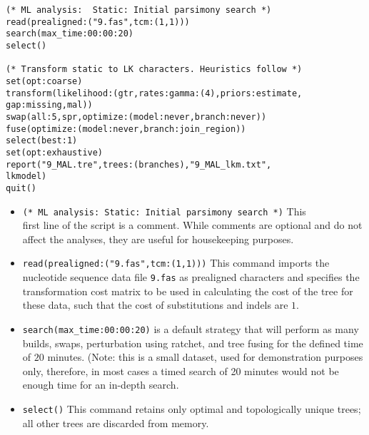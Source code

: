 \begin{verbatim}
(* ML analysis:  Static: Initial parsimony search *)
read(prealigned:("9.fas",tcm:(1,1)))
search(max_time:00:00:20)
select()

(* Transform static to LK characters. Heuristics follow *)
set(opt:coarse)
transform(likelihood:(gtr,rates:gamma:(4),priors:estimate, 
gap:missing,mal))
swap(all:5,spr,optimize:(model:never,branch:never))
fuse(optimize:(model:never,branch:join_region))
select(best:1)
set(opt:exhaustive)
report("9_MAL.tre",trees:(branches),"9_MAL_lkm.txt",
lkmodel)
quit()

\end{verbatim}

\begin{itemize}

\item \texttt{(* ML analysis: Static: Initial parsimony search *)} This \\ first line of the 
script is a comment. While comments are optional and do not affect the analyses, they are useful for 
housekeeping purposes.
\item \texttt{read(prealigned:("9.fas",tcm:(1,1)))} This command imports the nucleotide sequence data file \texttt{9.fas} 
as prealigned characters and specifies the transformation cost matrix to be used in calculating the cost of the tree
for these data, such that the cost of substitutions and indels are $1$.
\item \texttt{search(max\_time:00:00:20)}  is a default strategy that will perform as many builds, 
swaps,  perturbation using ratchet, and tree fusing for the defined time of $ 20 $ minutes. (Note: this is a small dataset, 
used for demonstration purposes only, therefore, in most cases a timed search of 20 minutes would not be enough time 
for an in-depth search.
\item \texttt{select()} This command retains only optimal and topologically unique trees; all other trees are discarded 
from memory.  


\end{itemize}
